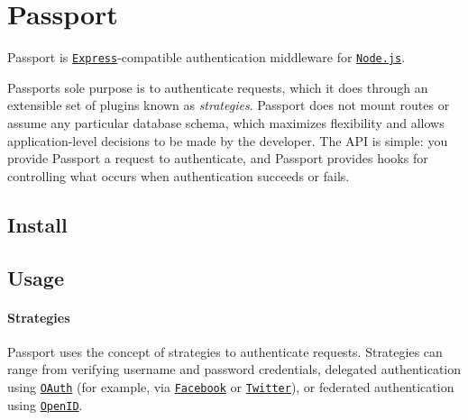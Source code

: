\href{http://passportjs.org}{\tt }

\section*{Passport}

\href{https://travis-ci.org/jaredhanson/passport}{\tt } \href{https://coveralls.io/r/jaredhanson/passport}{\tt } \href{https://codeclimate.com/github/jaredhanson/passport}{\tt } \href{https://david-dm.org/jaredhanson/passport}{\tt } \href{https://gratipay.com/jaredhanson/}{\tt }

Passport is \href{http://expressjs.com/}{\tt Express}-\/compatible authentication middleware for \href{http://nodejs.org/}{\tt Node.\+js}.

Passport\textquotesingle{}s sole purpose is to authenticate requests, which it does through an extensible set of plugins known as {\itshape strategies}. Passport does not mount routes or assume any particular database schema, which maximizes flexibility and allows application-\/level decisions to be made by the developer. The A\+PI is simple\+: you provide Passport a request to authenticate, and Passport provides hooks for controlling what occurs when authentication succeeds or fails.

\subsection*{Install}




\subsection*{Usage}

\paragraph*{Strategies}

Passport uses the concept of strategies to authenticate requests. Strategies can range from verifying username and password credentials, delegated authentication using \href{http://oauth.net/}{\tt O\+Auth} (for example, via \href{http://www.facebook.com/}{\tt Facebook} or \href{http://twitter.com/}{\tt Twitter}), or federated authentication using \href{http://openid.net/}{\tt Open\+ID}.

